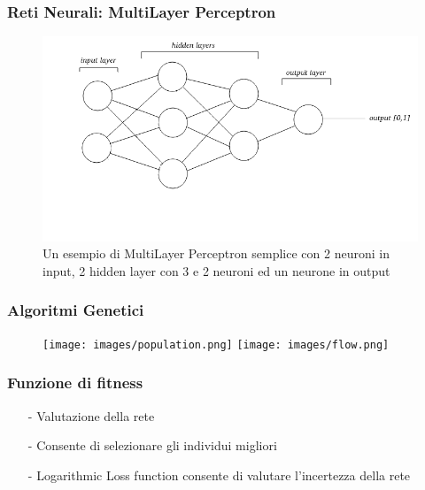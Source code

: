 \documentclass{beamer}
\begin{document}
\begin{frame}
\frametitle{Reti Neurali: MultiLayer Perceptron}
 \begin{figure}
  \includegraphics[scale = 0.4]{images/MLPClass.png}
  \caption{Un esempio di MultiLayer Perceptron semplice con 2 neuroni in input, 2 hidden layer con 3 e 2 neuroni ed un neurone in output}
 \end{figure}
\end{frame}

\begin{frame}
 \frametitle{Algoritmi Genetici}
 \begin{figure}
  
 \end{figure}
 \begin{figure}
  \texttt{[image: images/population.png]}
  \texttt{[image: images/flow.png]}
 \end{figure}
\end{frame}

\begin{frame}
 \frametitle{Funzione di fitness}
 \begin{enumerate}
  \item [-] Valutazione della rete 
  \item [-] Consente di selezionare gli individui migliori
  \item [-] Logarithmic Loss function consente di valutare l'incertezza della rete 
 \end{enumerate}

\end{frame}
\end{document}
